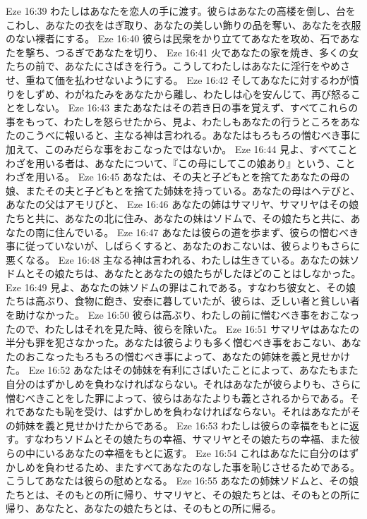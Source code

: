 Eze 16:39  わたしはあなたを恋人の手に渡す。彼らはあなたの高楼を倒し、台をこわし、あなたの衣をはぎ取り、あなたの美しい飾りの品を奪い、あなたを衣服のない裸者にする。
Eze 16:40  彼らは民衆をかり立ててあなたを攻め、石であなたを撃ち、つるぎであなたを切り、
Eze 16:41  火であなたの家を焼き、多くの女たちの前で、あなたにさばきを行う。こうしてわたしはあなたに淫行をやめさせ、重ねて価を払わせないようにする。
Eze 16:42  そしてあなたに対するわが憤りをしずめ、わがねたみをあなたから離し、わたしは心を安んじて、再び怒ることをしない。
Eze 16:43  またあなたはその若き日の事を覚えず、すべてこれらの事をもって、わたしを怒らせたから、見よ、わたしもあなたの行うところをあなたのこうべに報いると、主なる神は言われる。あなたはもろもろの憎むべき事に加えて、このみだらな事をおこなったではないか。
Eze 16:44  見よ、すべてことわざを用いる者は、あなたについて、『この母にしてこの娘あり』という、ことわざを用いる。
Eze 16:45  あなたは、その夫と子どもとを捨てたあなたの母の娘、またその夫と子どもとを捨てた姉妹を持っている。あなたの母はヘテびと、あなたの父はアモリびと、
Eze 16:46  あなたの姉はサマリヤ、サマリヤはその娘たちと共に、あなたの北に住み、あなたの妹はソドムで、その娘たちと共に、あなたの南に住んでいる。
Eze 16:47  あなたは彼らの道を歩まず、彼らの憎むべき事に従っていないが、しばらくすると、あなたのおこないは、彼らよりもさらに悪くなる。
Eze 16:48  主なる神は言われる、わたしは生きている。あなたの妹ソドムとその娘たちは、あなたとあなたの娘たちがしたほどのことはしなかった。
Eze 16:49  見よ、あなたの妹ソドムの罪はこれである。すなわち彼女と、その娘たちは高ぶり、食物に飽き、安泰に暮していたが、彼らは、乏しい者と貧しい者を助けなかった。
Eze 16:50  彼らは高ぶり、わたしの前に憎むべき事をおこなったので、わたしはそれを見た時、彼らを除いた。
Eze 16:51  サマリヤはあなたの半分も罪を犯さなかった。あなたは彼らよりも多く憎むべき事をおこない、あなたのおこなったもろもろの憎むべき事によって、あなたの姉妹を義と見せかけた。
Eze 16:52  あなたはその姉妹を有利にさばいたことによって、あなたもまた自分のはずかしめを負わなければならない。それはあなたが彼らよりも、さらに憎むべきことをした罪によって、彼らはあなたよりも義とされるからである。それであなたも恥を受け、はずかしめを負わなければならない。それはあなたがその姉妹を義と見せかけたからである。
Eze 16:53  わたしは彼らの幸福をもとに返す。すなわちソドムとその娘たちの幸福、サマリヤとその娘たちの幸福、また彼らの中にいるあなたの幸福をもとに返す。
Eze 16:54  これはあなたに自分のはずかしめを負わせるため、またすべてあなたのなした事を恥じさせるためである。こうしてあなたは彼らの慰めとなる。
Eze 16:55  あなたの姉妹ソドムと、その娘たちとは、そのもとの所に帰り、サマリヤと、その娘たちとは、そのもとの所に帰り、あなたと、あなたの娘たちとは、そのもとの所に帰る。
